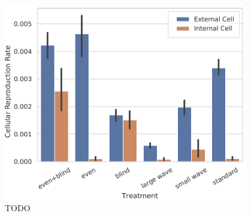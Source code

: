 \begin{figure}
  \begin{columns}
  \begin{column}{0.7\textwidth}
  \includegraphics[width=\textwidth]{img/title=reproductive_labor_surrounded+ext=}
  \end{column}
  \begin{column}{0.3\textwidth}
  \caption{
  TODO
  }
  \label{fig:differentiation}
  \end{column}
  \end{columns}
\end{figure}
